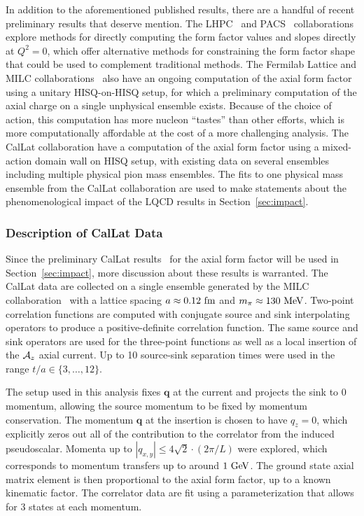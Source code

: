 In addition to the aforementioned published results, there are
 a handful of recent preliminary results that deserve mention.
The LHPC~\cite{Hasan:2017wwt} and PACS~\cite{Ishikawa:2021eut} collaborations
 explore methods for directly computing the form factor values and slopes
 directly at $Q^2=0$, which offer alternative methods for constraining
 the form factor shape that could be used to complement traditional methods.
The Fermilab Lattice and MILC collaborations~\cite{Meyer:2016kwb,Lin:2019pia,Lin:2020wko} also have an ongoing
 computation of the axial form factor using a unitary HISQ-on-HISQ setup,
 for which a preliminary computation of the axial charge on
 a single unphysical ensemble exists.
Because of the choice of action, this computation has more nucleon ``tastes''
 than other efforts, which is more computationally affordable
 at the cost of a more challenging analysis.
The CalLat collaboration have a computation of the axial form factor
 using a mixed-action domain wall on HISQ setup,
 with existing data on several ensembles including multiple physical pion mass ensembles.
The fits to one physical mass ensemble from the CalLat collaboration are used
 to make statements about the phenomenological impact of the LQCD results in Section~\ref{sec:impact}.

\subsubsection{Description of CalLat Data}\label{sec:callatdata}

Since the preliminary CalLat results~\cite{Meyer:2021vfq} for the axial form factor will be used
 in Section~\ref{sec:impact}, more discussion about these results is warranted.
The CalLat data are collected on a single ensemble generated
 by the MILC collaboration~\cite{MILC:2012znn}
 with a lattice spacing $a\approx 0.12~{\rm fm}$ and $m_\pi\approx 130~{\rm MeV}$.
Two-point correlation functions are computed with conjugate
 source and sink interpolating operators
 to produce a positive-definite correlation function.
The same source and sink operators are used for the three-point functions
 as well as a local insertion of the ${\cal A}_z$ axial current.
Up to 10 source-sink separation times were used in the range $t/a\in\{3,\dots,12\}$.

The setup used in this analysis fixes $\bm{q}$ at the current
 and projects the sink to 0 momentum, allowing the source momentum to be
 fixed by momentum conservation.
The momentum $\bm{q}$ at the insertion is chosen to have $q_z=0$,
 which explicitly zeros out all of the contribution to the correlator
 from the induced pseudoscalar.
Momenta up to $|q_{x,y}| \leq 4\sqrt{2}\cdot (2\pi/L)$ were explored,
 which corresponds to momentum transfers up to around $1~{\rm GeV}$.
The ground state axial matrix element is then proportional to the axial form factor,
 up to a known kinematic factor.
The correlator data are fit using a parameterization that allows
 for 3 states at each momentum.


